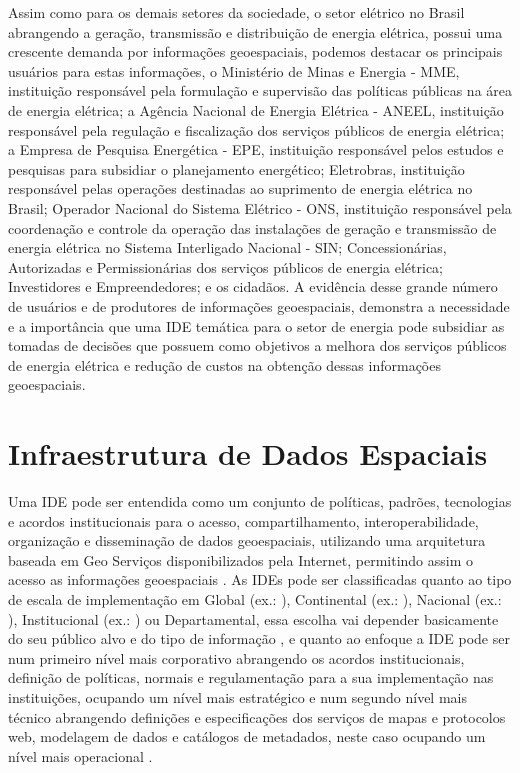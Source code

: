 \documentclass[preprint,authoryear,11pt]{elsarticle}
\begin{document}
\begin{multicols}{2}
Assim como para os demais setores da sociedade, o setor elétrico no Brasil abrangendo a geração, transmissão e distribuição de energia elétrica, possui uma crescente demanda por informações geoespaciais, podemos destacar os principais usuários para estas informações, o Ministério de Minas e Energia - MME, instituição responsável pela formulação e supervisão das políticas públicas na área de energia elétrica;   a Agência Nacional de Energia Elétrica - ANEEL, instituição responsável pela regulação e fiscalização dos serviços públicos de energia elétrica; a Empresa de Pesquisa Energética - EPE, instituição responsável pelos estudos e pesquisas para subsidiar o planejamento energético; Eletrobras, instituição responsável pelas operações destinadas ao suprimento de energia elétrica no Brasil; Operador Nacional do Sistema Elétrico - ONS, instituição responsável pela coordenação e controle da operação das instalações de geração e transmissão de energia elétrica no Sistema Interligado Nacional - SIN; Concessionárias, Autorizadas e Permissionárias dos serviços públicos de energia elétrica; Investidores e Empreendedores; e os cidadãos. A evidência desse grande número de usuários e de produtores de informações geoespaciais, demonstra a necessidade e a importância que uma IDE temática para o setor de energia pode subsidiar as tomadas de decisões que possuem como objetivos a melhora dos serviços públicos de energia elétrica e redução de custos na obtenção dessas informações geoespaciais.         



\section{Infraestrutura de Dados Espaciais}

Uma IDE pode ser entendida como um conjunto de políticas, padrões, tecnologias e acordos institucionais para o acesso, compartilhamento, interoperabilidade, organização e disseminação de dados geoespaciais, utilizando uma arquitetura baseada em Geo Serviços disponibilizados pela Internet, permitindo assim o acesso as informações geoespaciais \citep{DAmore2012ICTManagement, Kobben2013TowardsInfrastructure, Stock2012ToInfrastructure, Hendriks2012ReconsideringInfrastructure, NeamahJebur2013ANSDI, Makanga2010AAfrica}. As IDEs pode ser classificadas quanto ao tipo de escala de implementação em Global (ex.: \citeauthor{unggim}), Continental (ex.: \citeauthor{inspire}), Nacional (ex.: \citeauthor{inde,nsdi,cgdi}), Institucional (ex.: \citeauthor{geoportal}) ou Departamental, essa escolha vai depender basicamente do seu público alvo e do tipo de informação \citep{Bejar2012AnInfrastructures}, e quanto ao enfoque a IDE pode ser num primeiro nível mais corporativo abrangendo os acordos institucionais, definição de políticas, normais e regulamentação para a sua implementação nas instituições, ocupando um nível mais estratégico e num segundo nível mais técnico abrangendo definições e especificações dos serviços de mapas e protocolos web, modelagem de dados e catálogos de metadados, neste caso ocupando um nível mais operacional \citep{Cooper2013AViewpoint}. 


\end{multicols}
\end{document}
